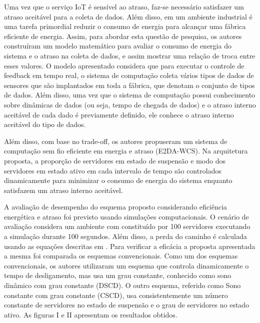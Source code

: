 Uma vez que o serviço IoT é sensível ao atraso, faz-se necessário satisfazer um atraso aceitável para a coleta de dados. Além disso, em um ambiente industrial é uma tarefa primordial reduzir o consumo de energia para alcançar uma fábrica eficiente de energia. Assim, para abordar esta questão de pesquisa, os autores construíram um modelo matemático para avaliar o consumo de energia do sistema e o atraso na coleta de dados, e assim mostrar uma relação de troca entre esses valores. O modelo apresentado considera que para executar o controle de feedback em tempo real, o sistema de computação coleta vários tipos de dados de sensores que são implantados em toda a fábrica, que denotam o conjunto de tipos de dados. Além disso, uma vez que o sistema de computação possui conhecimento sobre dinâmicas de dados (ou seja, tempo de chegada de dados) e o atraso interno aceitável de cada dado é previamente definido, ele conhece o atraso interno aceitável do tipo de dados.

Além disso, com base no trade-off, os autores propuseram um sistema de computação sem fio eficiente em energia e atraso (E2DA-WCS). Na arquitetura proposta, a proporção de servidores em estado de suspensão e modo dos servidores em estado ativo em cada intervalo de tempo são controlados dinamicamente para minimizar o consumo de energia do sistema enquanto satisfazem um atraso interno aceitável.

A avaliação de desempenho do esquema proposto considerando eficiência energética e atraso foi previsto usando simulações computacionais. O cenário de avaliação considera um ambiente com constituído por 100 servidores executando a simulação durante 100 segundos. Além disso, a perda do caminho é calculada usando as equações descritas em \cite{suto2015failure}. Para verificar a eficácia a proposta apresentada a mesma foi comparada os esquemas convencionais. Como um dos esquemas convencionais, os autores utilizaram um esquema que controla dinamicamente o tempo de desligamento, mas usa um grau constante, conhecido como sono dinâmico com grau constante (DSCD). O outro esquema, referido como Sono constante com grau constante (CSCD), usa consistentemente um número constante de servidores no estado de suspensão e o grau de servidores no estado ativo. As figuras I e II apresentam os resultados obtidos.

